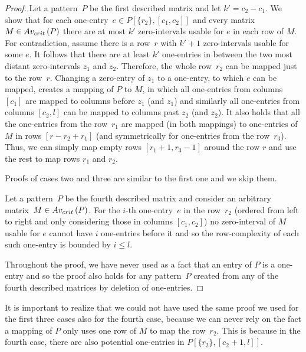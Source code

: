 \begin{proof}
Let a pattern~$P$ be the first described matrix and let $k'=c_2-c_1$. We show that for each one-entry~$e\in P[\{r_2\},[c_1,c_2]]$ and every matrix~$M\in Av_{crit}\left(P\right)$ there are at most $k'$ zero-intervals usable for $e$ in each row of $M$. For contradiction, assume there is a row~$r$ with $k'+1$ zero-intervals usable for some $e$. It follows that there are at least $k'$ one-entries in between the two most distant zero-intervals $z_1$ and $z_2$. Therefore, the whole row~$r_2$ can be mapped just to the row~$r$. Changing a zero-entry of $z_1$ to a one-entry, to which $e$ can be mapped, creates a mapping of $P$ to $M$, in which all one-entries from columns $[c_1]$ are mapped to columns before $z_1$ (and $z_1$) and similarly all one-entries from columns $[c_2,l]$ can be mapped to columns past $z_2$ (and $z_2$). It also holds that all the one-entries from the row~$r_1$ are mapped (in both mappings) to one-entries of $M$ in rows $[r-r_2+r_1]$ (and symmetrically for one-entries from the row~$r_3$). Thus, we can simply map empty rows $[r_1+1,r_3-1]$ around the row $r$ and use the rest to map rows $r_1$ and $r_2$.

Proofs of cases two and three are similar to the first one and we skip them.

Let a pattern~$P$ be the fourth described matrix and consider an arbitrary matrix~$M\in Av_{crit}\left(P\right)$. For the $i$-th one-entry~$e$ in the row~$r_2$ (ordered from left to right and only considering those in columns $[c_1,c_2]$) no zero-interval of $M$ usable for $e$ cannot have $i$ one-entries before it and so the row-complexity of each such one-entry is bounded by $i\leq l$.

Throughout the proof, we have never used as a fact that an entry of $P$ is a one-entry and so the proof also holds for any pattern~$P$ created from any of the fourth described matrices by deletion of one-entries.
\end{proof}

It is important to realize that we could not have used the same proof we used for the first three cases also for the fourth case, because we can never rely on the fact a mapping of $P$ only uses one row of $M$ to map the row~$r_2$. This is because in the fourth case, there are also potential one-entries in $P[\{r_2\},[c_2+1,l]]$.

